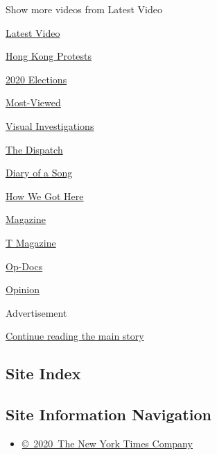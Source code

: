 Show more videos from Latest Video

\href{/video}{}

\href{/video/latest-video}{Latest Video}

\href{/video/hk-protest}{Hong Kong Protests}

\href{/video/2020-Elections}{2020 Elections}

\href{/video/Most-Viewed}{Most-Viewed}

\href{/video/investigations}{Visual Investigations}

\href{/video/on-the-ground}{The Dispatch}

\href{/video/diaryofasong}{Diary of a Song}

\href{/video/how-we-got-here}{How We Got Here}

\href{/video/magazine}{Magazine}

\href{/video/t-magazine}{T Magazine}

\href{/video/op-docs}{Op-Docs}

\href{/video/opinion}{Opinion}

Advertisement

\protect\hyperlink{after-bottom}{Continue reading the main story}

\hypertarget{site-index}{%
\subsection{Site Index}\label{site-index}}

\hypertarget{site-information-navigation}{%
\subsection{Site Information
Navigation}\label{site-information-navigation}}

\begin{itemize}
\tightlist
\item
  \href{https://help.nytimes.com/hc/en-us/articles/115014792127-Copyright-notice}{©~2020~The
  New York Times Company}
\end{itemize}

